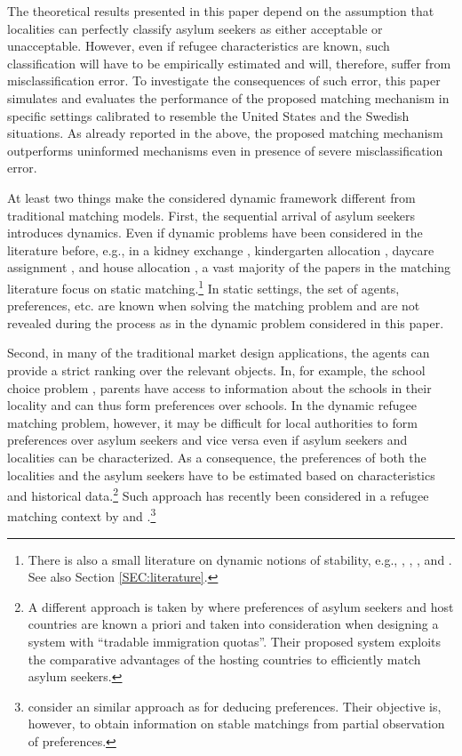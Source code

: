 \documentclass[12pt,fleqn]{article}
\begin{document}
The theoretical results presented in this paper depend on the assumption that localities can perfectly classify asylum seekers as either acceptable or unacceptable. However, even if refugee characteristics are known, such classification will have to be empirically estimated and will, therefore, suffer from misclassification error. To investigate the consequences of such error, this paper simulates and evaluates the performance of the proposed matching mechanism in specific settings calibrated to resemble the United States and the Swedish situations. As already reported in the above, the proposed matching mechanism outperforms uninformed mechanisms even in presence of severe misclassification error.

At least two things make the considered dynamic framework different from traditional matching models. First, the sequential arrival of asylum seekers introduces dynamics. Even if dynamic problems have been considered in the literature before, e.g., in a kidney exchange \citep{bib:Unver}, kindergarten allocation \citep{bib:KennesEtAl2014}, daycare assignment \citep{bib:KennesEtAl2014}, and house allocation \citep{bib:BlochCantala,bib:Kurino}, a vast majority of the papers in the matching literature focus on static matching.\footnote{There is also a small literature on dynamic notions of stability, e.g., \citet{bib:DamianoLam}, \citet{bib:Gudmundsson}, \citet{bib:KadamEtAl2018b}, and \citet{bib:Kurino}. See also Section \ref{SEC:literature}.} In static settings, the set of agents, preferences, etc. are known when solving the matching problem and are not revealed during the process as in the dynamic problem considered in this paper.

Second, in many of the traditional market design applications, the agents can provide a strict ranking over the relevant objects. In, for example, the school choice problem \citep{bib:AbdulkadirougluSonmez}, parents have access to information about the schools in their locality and can thus form preferences over schools. In the dynamic refugee matching problem, however, it may be difficult for local authorities to form preferences over asylum seekers and vice versa even if asylum seekers and localities can be characterized. As a consequence, the preferences of both the localities and the asylum seekers have to be estimated based on characteristics and historical data.\footnote{A different approach is taken by \citet{bib:MoragaEtAl} where preferences of asylum seekers and host countries are known a priori and taken into consideration when designing a system with ``tradable immigration quotas''. Their proposed system exploits the comparative advantages of the hosting countries to efficiently match asylum seekers.} Such approach has recently been considered in a refugee matching context by \citet{bib:AnderssonEhlers} and \citet{bib:BansakEtAl}.\footnote{\citet{bib:HaeringerIehle} consider an similar approach as \citet{bib:AnderssonEhlers} for deducing preferences. Their objective is, however, to obtain information on stable matchings from partial observation of preferences.}
\end{document}
